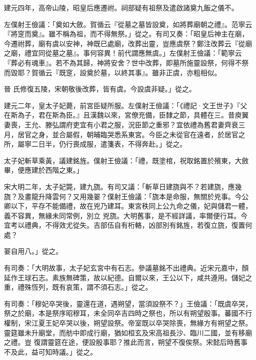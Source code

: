 
\begin{pinyinscope}

 建元四年，高帝山陵，昭皇后應遷祔。祠部疑有祖祭及遣啟諸奠九飯之儀不。



 左僕射王儉議：「奠如大斂。賀循云『從墓之墓皆設奠，如將葬廟朝之禮』。范寧云『將窆而奠』。雖不稱為祖，而不得無祭。」從之。有司又奏：「昭皇后神主在廟，今遷祔葬，廟有虞以安神，神既已處廟，改葬出靈，豈應虞祭？鄭注改葬云『從廟之廟，禮宜同從墓之墓』。事何容異！前代謂應無虞。」左僕射王儉議：「範寧云『葬必有魂車』。若不為其歸，神將安舍？世中改葬，即墓所施靈設祭，何得不祭而毀耶？賀循云『既窆，設奠於墓，以終其事』。雖非正虞，亦粗相似。



 晉
 氏修復五陵，宋朝敬後改葬，皆有虞。今設虞非疑。」從之。



 建元二年，皇太子妃薨，前宮臣疑所服。左僕射王儉議：「《禮記·文王世子》『父在斯為子，君在斯為臣。』且漢魏以來，宮僚充備，臣隸之節，具體在三。昔庾翼妻喪，王允、滕弘謂府吏宜有小君之服，況臣節之重邪？宜依禮為舊君妻齊衰三月，居官之身，並合屬假，朝晡臨哭悉系東宮。今臣之未從官在遠者，於居官之所，屬寧二日半，仍行喪成服，遣箋表，不得奔赴。」從之。



 太子妃斬草乘黃，議建銘旌。僕射王儉議：「禮，既塗棺，祝取銘置於殯東，大斂畢，便應建於西階之東。」



 宋大明二年，太子妃斃，建九旒。有司又議：「斬草日建旒與不？若建旒，應幾旒？及畫龍升降雲何？又用幾翣？僕射王儉議：「旒本是命服，無關於兇事。今公卿以下，平存不能備禮，故在兇乃建耳。東宮秩同上公九命之儀，妃與儲君一體，義不容異，無緣未同常例，別立
 兇旒。大明舊事，是不經詳議，率爾便行耳。今宜考以禮典，不得效尤從失。吉部伍自有桁輅，凶部別有銘旌，若復立旒，復置何處？



 翣自用八。」從之。



 有司奏：「大明故事，太子妃玄宮中有石志。參議墓銘不出禮典。近宋元嘉中，顏延作王球石志。素族無碑策，故以紀德。自爾以來，王公以下，咸共遵用。儲妃之重，禮殊恆列，既有哀策，謂不須石志。」從之。



 有司奏：「穆妃卒哭後，靈還在道，遇朔望，當須設祭不？」王儉議：「既虞卒哭，祭之於廟，本是祭序昭穆耳，未全同卒吉四時之祭也，所以有朔望殷事。蕃國不行權制，宋江夏王妃卒哭以後，朔望設祭。帝室既以卒哭除喪，無緣方有朔望之祭。靈筵雖未升廟堂，而舫中即成行廟，猶如桓玄及宋高祖長沙、臨川二國，並有移廟之禮。豈
 復謂靈筵在途，便設殷事耶？推此而言，朔望不復俟祭。宋懿后時舊事不及此，益可知時議。」從之。




\end{pinyinscope}
